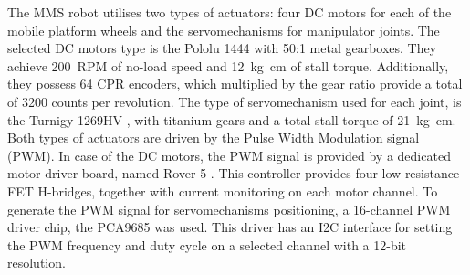 The MMS robot utilises two types of actuators: four DC motors for each of the mobile platform wheels and the servomechanisms for manipulator joints. The selected DC motors type is the Pololu 1444 \cite{pololu} with 50:1 metal gearboxes. They achieve \SI{200}{RPM} of no-load speed and \SI{12}{\kilogram \centi\metre} of stall torque. Additionally, they possess 64 CPR encoders, which multiplied by the gear ratio provide a total of 3200 counts per revolution. The type of servomechanism used for each joint, is the Turnigy 1269HV \cite{turnigy}, with titanium gears and a total stall torque of \SI{21}{\kilogram\centi\metre}. Both types of actuators are driven by the Pulse Width Modulation signal (PWM). In case of the DC motors, the PWM signal is provided by a dedicated motor driver board, named Rover 5 \cite{rover5}. This controller provides four low-resistance FET H-bridges, together with current monitoring on each motor channel. To generate the PWM signal for servomechanisms positioning, a 16-channel PWM driver chip, the PCA9685 \cite{pca9685} was used. This driver has an I2C interface for setting the PWM frequency and duty cycle on a selected channel with a 12-bit resolution.



